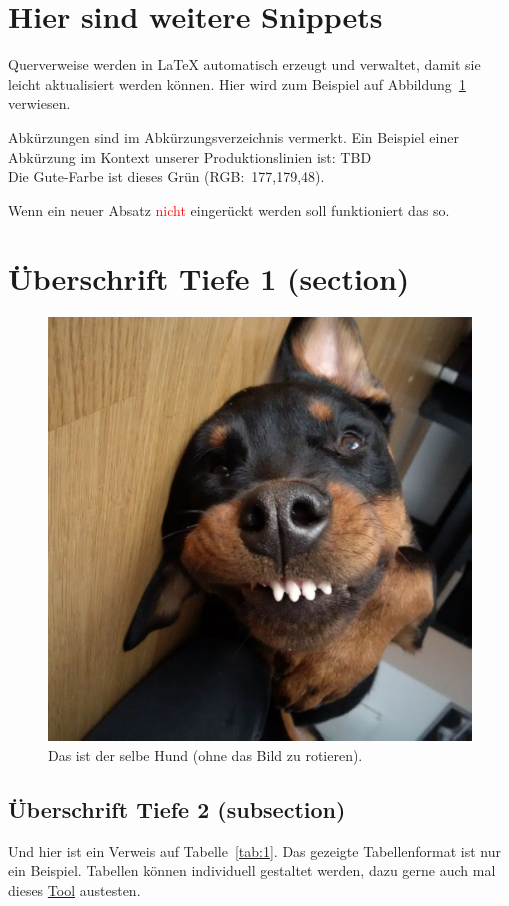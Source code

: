 
\section{Hier sind weitere Snippets}

Querverweise werden in \LaTeX{} automatisch erzeugt und verwaltet, damit sie leicht aktualisiert werden können. 
Hier wird zum Beispiel auf Abbildung~\ref{Abb:hund} verwiesen.

Abkürzungen sind im Abkürzungsverzeichnis vermerkt. Ein Beispiel einer Abkürzung im Kontext unserer Produktionslinien ist: \ac{TBD}\\

Die \glqq{}Gute-Farbe\grqq{} ist \textcolor{FAVgreen}{dieses Grün (RGB:~177,179,48)}.

\noindent Wenn ein neuer Absatz \textcolor{red}{nicht} eingerückt werden soll funktioniert das so.

    \section{Überschrift Tiefe 1 (section)}
    
    \begin{figure}[!htbp]
        \centering
        \includegraphics[width=0.7\linewidth]{PICs/hund.png}
        \caption{Das ist der selbe Hund (ohne das Bild zu rotieren).}
        \label{Abb:hund}
    \end{figure}
    
    \clearpage
        \subsection{Überschrift Tiefe 2 (subsection)}
        Und hier ist ein Verweis auf Tabelle~\ref{tab:1}. Das gezeigte Tabellenformat ist nur ein Beispiel. 
        Tabellen können individuell gestaltet werden, dazu gerne auch mal dieses \hyperref{https://www.tablesgenerator.com/}{category}{name}{Tool} austesten.\\
    
